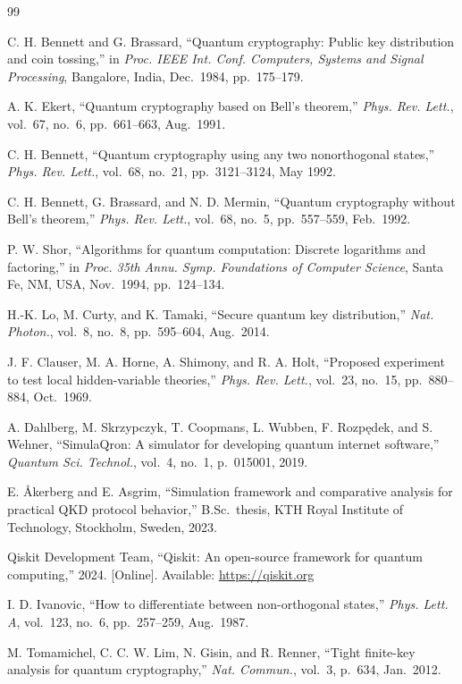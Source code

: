 \documentclass[journal]{IEEEtran}
\begin{document}
\begin{thebibliography}{99}

C. H. Bennett and G. Brassard,
``Quantum cryptography: Public key distribution and coin tossing,''
in \textit{Proc. IEEE Int. Conf. Computers, Systems and Signal Processing},
Bangalore, India, Dec.\ 1984, pp.\ 175--179.

A. K. Ekert,
``Quantum cryptography based on Bell's theorem,''
\textit{Phys. Rev. Lett.}, vol.\ 67, no.\ 6, pp.\ 661--663, Aug.\ 1991.

C. H. Bennett,
``Quantum cryptography using any two nonorthogonal states,''
\textit{Phys. Rev. Lett.}, vol.\ 68, no.\ 21, pp.\ 3121--3124, May 1992.

C. H. Bennett, G. Brassard, and N. D. Mermin,
``Quantum cryptography without Bell's theorem,''
\textit{Phys. Rev. Lett.}, vol.\ 68, no.\ 5, pp.\ 557--559, Feb.\ 1992.

P. W. Shor,
``Algorithms for quantum computation: Discrete logarithms and
factoring,''
in \textit{Proc. 35th Annu. Symp. Foundations of Computer Science},
Santa Fe, NM, USA, Nov.\ 1994, pp.\ 124--134.

H.-K. Lo, M. Curty, and K. Tamaki,
``Secure quantum key distribution,''
\textit{Nat. Photon.}, vol.\ 8, no.\ 8, pp.\ 595--604, Aug.\ 2014.

J. F. Clauser, M. A. Horne, A. Shimony, and R. A. Holt,
``Proposed experiment to test local hidden-variable theories,''
\textit{Phys. Rev. Lett.}, vol.\ 23, no.\ 15, pp.\ 880--884, Oct.\ 1969.

A. Dahlberg, M. Skrzypczyk, T. Coopmans, L. Wubben, F. Rozp\k{e}dek,
and S. Wehner,
``SimulaQron: A simulator for developing quantum internet software,''
\textit{Quantum Sci. Technol.}, vol.\ 4, no.\ 1, p.\ 015001, 2019.

E. {\AA}kerberg and E. Asgrim,
``Simulation framework and comparative analysis for practical QKD
protocol behavior,''
B.Sc.\ thesis, KTH Royal Institute of Technology, Stockholm,
Sweden, 2023.

Qiskit Development Team,
``Qiskit: An open-source framework for quantum computing,''
2024. [Online]. Available: \url{https://qiskit.org}

I. D. Ivanovic,
``How to differentiate between non-orthogonal states,''
\textit{Phys. Lett. A}, vol.\ 123, no.\ 6, pp.\ 257--259, Aug.\ 1987.

M. Tomamichel, C. C. W. Lim, N. Gisin, and R. Renner,
``Tight finite-key analysis for quantum cryptography,''
\textit{Nat. Commun.}, vol.\ 3, p.\ 634, Jan.\ 2012.

\end{thebibliography}
\end{document}
